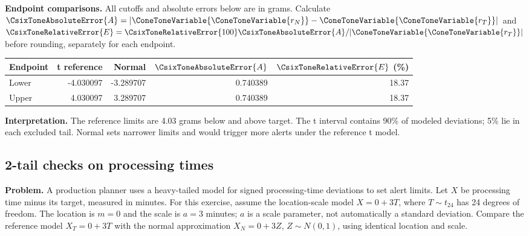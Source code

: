 \textbf{Endpoint comparisons.} All cutoffs and absolute errors below are in grams. Calculate $\CsixToneAbsoluteError{A}=|\ConeToneVariable{\ConeToneVariable{r_N}}-\ConeToneVariable{\ConeToneVariable{r_T}}|$ and $\CsixToneRelativeError{E}=\CsixToneRelativeError{100}\CsixToneAbsoluteError{A}/|\ConeToneVariable{\ConeToneVariable{r_T}}|$ before rounding, separately for each endpoint.
\begin{center}\begin{tabular}{lrrrr}\toprule Endpoint & t reference & Normal & $\CsixToneAbsoluteError{A}$ & $\CsixToneRelativeError{E}$ (\%)\\\midrule
Lower&-4.030097&-3.289707&0.740389&18.37\\
Upper&4.030097&3.289707&0.740389&18.37\\
\bottomrule\end{tabular}\end{center}
\textbf{Interpretation.} The reference limits are 4.03 grams below and above target. The t interval contains 90\% of modeled deviations; 5\% lie in each excluded tail. Normal sets narrower limits and would trigger more alerts under the reference t model.


\clearpage
\subsection{2-tail checks on processing times}
\label{c9-i6}
\textbf{Problem.} A production planner uses a heavy-tailed model for signed processing-time deviations to set alert limits. Let $X$ be processing time minus its target, measured in minutes. For this exercise, assume the location-scale model $X=0+3T$, where $T\sim t_{24}$ has 24 degrees of freedom. The location is $m=0$ and the scale is $a=3$ minutes; $a$ is a scale parameter, not automatically a standard deviation. Compare the reference model $X_T=0+3T$ with the normal approximation $X_N=0+3Z$, $Z\sim N(0,1)$, using identical location and scale.
